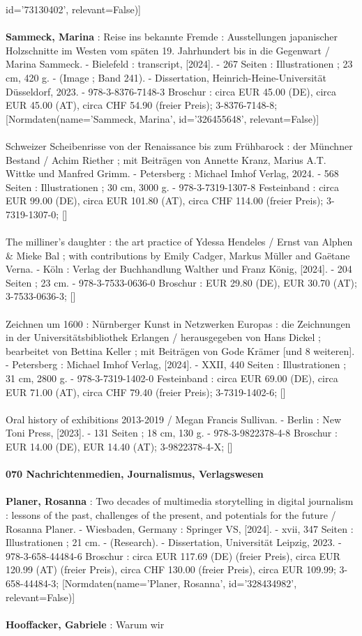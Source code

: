\documentclass{article}
\begin{document}
\begin{multicols}{3}
id='73130402', relevant=False)]\\\\\textbf{Sammeck, Marina} : Reise ins bekannte Fremde : Ausstellungen japanischer Holzschnitte im Westen vom späten 19. Jahrhundert bis in die Gegenwart / Marina Sammeck. - Bielefeld : transcript, [2024]. - 267 Seiten : Illustrationen ; 23 cm, 420 g. - (Image ; Band 241). - Dissertation, Heinrich-Heine-Universität Düsseldorf, 2023. - 978-3-8376-7148-3 Broschur : circa EUR 45.00 (DE), circa EUR 45.00 (AT), circa CHF 54.90 (freier Preis); 3-8376-7148-8; [Normdaten(name='Sammeck, Marina', id='326455648', relevant=False)]\\\\Schweizer Scheibenrisse von der Renaissance bis zum Frühbarock : der Münchner Bestand / Achim Riether ; mit Beiträgen von Annette Kranz, Marius A.T. Wittke und Manfred Grimm. - Petersberg : Michael Imhof Verlag, 2024. - 568 Seiten : Illustrationen ; 30 cm, 3000 g. - 978-3-7319-1307-8 Festeinband : circa EUR 99.00 (DE), circa EUR 101.80 (AT), circa CHF 114.00 (freier Preis); 3-7319-1307-0; []\\\\The milliner's daughter : the art practice of  Ydessa Hendeles / Ernst van Alphen \& Mieke Bal ; with contributions by Emily Cadger, Markus Müller and Gaëtane Verna. - Köln : Verlag der Buchhandlung Walther und Franz König, [2024]. - 204 Seiten ; 23 cm. - 978-3-7533-0636-0 Broschur : EUR 29.80 (DE), EUR 30.70 (AT); 3-7533-0636-3; []\\\\Zeichnen um 1600 : Nürnberger Kunst in Netzwerken Europas : die Zeichnungen in der Universitätsbibliothek Erlangen / herausgegeben von Hans Dickel ; bearbeitet von Bettina Keller ; mit Beiträgen von Gode Krämer [und 8 weiteren]. - Petersberg : Michael Imhof Verlag, [2024]. - XXII, 440 Seiten : Illustrationen ; 31 cm, 2800 g. - 978-3-7319-1402-0 Festeinband : circa EUR 69.00 (DE), circa EUR 71.00 (AT), circa CHF 79.40 (freier Preis); 3-7319-1402-6; []\\\\Oral history of exhibitions 2013-2019 / Megan Francis Sullivan. - Berlin : New Toni Press, [2023]. - 131 Seiten ; 18 cm, 130 g. - 978-3-9822378-4-8 Broschur : EUR 14.00 (DE), EUR 14.40 (AT); 3-9822378-4-X; []\\\\\textbf{070 Nachrichtenmedien, Journalismus, Verlagswesen}\\\\\textbf{Planer, Rosanna} : Two decades of multimedia storytelling in digital journalism : lessons of the past, challenges of the present, and potentials for the future / Rosanna Planer. - Wiesbaden, Germany : Springer VS, [2024]. - xvii, 347 Seiten : Illustrationen ; 21 cm. - (Research). - Dissertation, Universität Leipzig, 2023. - 978-3-658-44484-6 Broschur : circa EUR 117.69 (DE) (freier Preis), circa EUR 120.99 (AT) (freier Preis), circa CHF 130.00 (freier Preis), circa EUR 109.99; 3-658-44484-3; [Normdaten(name='Planer, Rosanna', id='328434982', relevant=False)]\\\\\textbf{Hooffacker, Gabriele} : Warum wir 
\end{multicols}
\end{document}
